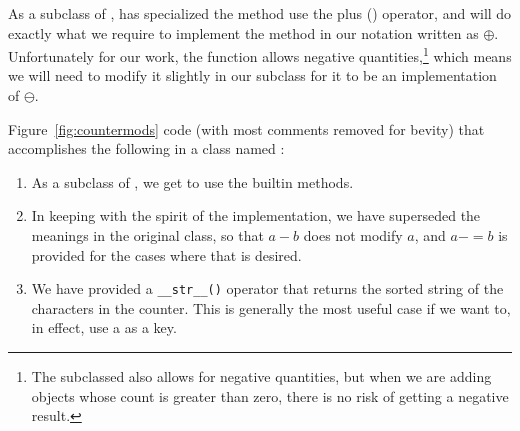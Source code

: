 \documentclass[letterpaper, 11pt]{article}
\begin{document}
As a subclass of ,  has specialized the
 method use the plus (\lit{+}) operator, and will do
exactly what we require to implement the method in our notation
written as $\oplus$. Unfortunately for our work, the 
function allows negative quantities,\footnote{The subclassed
 also allows for negative quantities, but when we are
adding objects whose count is greater than zero, there is no risk
of getting a negative result.} which means we will need to modify
it slightly in our subclass for it to be an implementation of
$\ominus$.

Figure~\ref{fig:countermods} code (with most comments removed for bevity)
that accomplishes the following in a class named :

\begin{enumerate}
\item As a subclass of , we get to use the builtin
methods.

\item In keeping with the spirit of the  implementation,
we have superseded the meanings in the original class, so that $a - b$ does
not modify $a$, and $a -= b$ is provided for the cases where that is
desired.

\item We have provided a \verb|__str__()| operator that returns the
sorted string of the characters in the counter. This is generally the
most useful case if we want to, in effect, use a  as 
a key. 

\end{enumerate}
\end{document}
